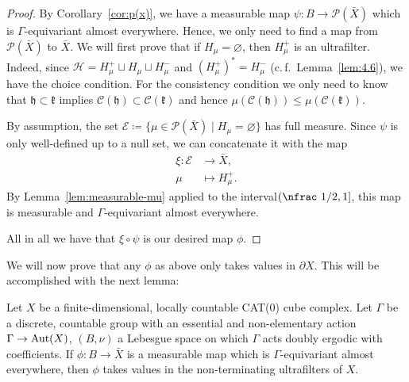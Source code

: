 \begin{proof}
  By Corollary~\ref{cor:p(x)}, we have a measurable map \(\psi\colon B \to \mathcal{P}(\bar X)\) which is \(\Gamma\)-equi\-variant almost everywhere. Hence, we only need to find a map from \(\mathcal{P}(\bar X)\) to \(\bar X\). We will first prove that if \(H_\mu = \varnothing\), then \(H_\mu^+\) is an ultrafilter. Indeed, since \(\mathcal{H} = H_\mu^+ \sqcup H_\mu \sqcup H_\mu^-\) and \((H_\mu^+)^\ast = H_\mu^-\) (c.\,f.~Lemma~\ref{lem:4.6}), we have the choice condition. For the consistency condition we only need to know that \(\mathfrak{h} \subset \mathfrak{k}\) implies \(\mathcal{C}(\mathfrak{h}) \subset \mathcal{C}(\mathfrak{k})\) and hence \(\mu(\mathcal{C}(\mathfrak{h}))\leq \mu(\mathcal{C}(\mathfrak{k}))\).

  By assumption, the set \(\mathcal{E} \coloneqq \{\mu \in \mathcal{P}(\bar X) \mid H_\mu = \varnothing\}\) has full measure. Since \(\psi\) is only well-defined up to a null set, we can concatenate it with the map
  \begin{align*}
    \xi\colon \mathcal{E} &\to \bar X,\\
    \mu &\mapsto H_\mu^+.
  \end{align*}
  By Lemma~\ref{lem:measurable-mu} applied to the interval\({(\text{\nfrac 1/2}, 1]}\), this map is measurable and \(\Gamma\)-equivariant almost everywhere.

  All in all we have that \(\xi \circ \psi\) is our desired map \(\phi\).
\end{proof}

We will now prove that any \(\phi\) as above only takes values in \(\partial X\). This will be accomplished with the next lemma:

\begin{lemma}[{\cite[Lemma~4.11]{MR3509968}}]
  \label{lem:4.11}
  Let \(X\) be a finite-dimensional, locally countable CAT(0) cube complex. Let  \(\Gamma\) be a discrete, countable group with an essential and non-elementary action \(\Gamma \to \operatorname{Aut}(X)\), \((B, \nu)\) a Lebesgue space on which \(\Gamma\) acts doubly ergodic with coefficients. If \(\phi\colon B \to \bar X\) is a measurable map which is \(\Gamma\)-equivariant almost everywhere, then \(\phi\) takes values in the non-terminating ultrafilters of \(X\).
\end{lemma}

